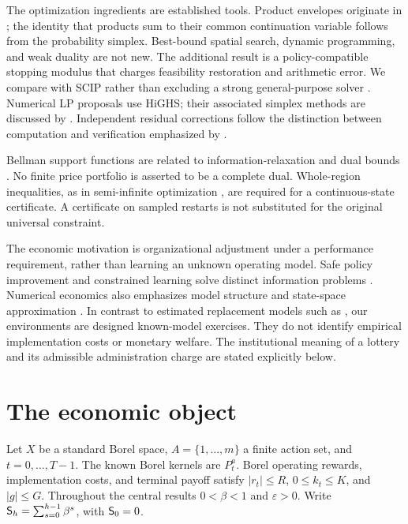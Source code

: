 The optimization ingredients are established tools. Product envelopes originate in \citet{McCormick1976}; the identity that products sum to their common continuation variable follows from the probability simplex. Best-bound spatial search, dynamic programming, and weak duality are not new. The additional result is a policy-compatible stopping modulus that charges feasibility restoration and arithmetic error. We compare with SCIP rather than excluding a strong general-purpose solver \citep{HojnyEtAl2025}. Numerical LP proposals use HiGHS; their associated simplex methods are discussed by \citet{HuangfuHall2018}. Independent residual corrections follow the distinction between computation and verification emphasized by \citet{Rump2010}.

Bellman support functions are related to information-relaxation and dual bounds \citep{BrownSmithSun2010,BrownSmith2014}. No finite price portfolio is asserted to be a complete dual. Whole-region inequalities, as in semi-infinite optimization \citep{HettichKortanek1993}, are required for a continuous-state certificate. A certificate on sampled restarts is not substituted for the original universal constraint.

The economic motivation is organizational adjustment under a performance requirement, rather than learning an unknown operating model. Safe policy improvement and constrained learning solve distinct information problems \citep{Laroche2019,DingEtAl2020,NiKamgarpour2025}. Numerical economics also emphasizes model structure and state-space approximation \citep{Judd1998,BrummScheidegger2017}. In contrast to estimated replacement models such as \citet{Rust1987}, our environments are designed known-model exercises. They do not identify empirical implementation costs or monetary welfare. The institutional meaning of a lottery and its admissible administration charge are stated explicitly below.

\section{The economic object}\label{sec:model45}
Let $X$ be a standard Borel space, $A=\{1,\ldots,m\}$ a finite action set, and $t=0,\ldots,T-1$. The known Borel kernels are $P_t^a$. Borel operating rewards, implementation costs, and terminal payoff satisfy $|r_t|\le R$, $0\le k_t\le K$, and $|g|\le G$. Throughout the central results $0<\beta<1$ and $\varepsilon>0$. Write $\mathsf S_{h}=\sum_{s=0}^{h-1}\beta^s$, with $\mathsf S_{0}=0$.

